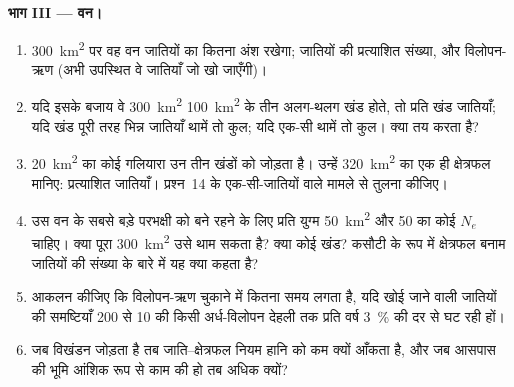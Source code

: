 \begin{problem}
\medskip
\noindent\textbf{भाग III --- वन।}
\begin{enumerate}[resume]
  \item \qty{300}{km^2} पर वह वन जातियों का कितना अंश रखेगा; जातियों की
        प्रत्याशित संख्या, और विलोपन-ऋण (अभी उपस्थित वे जातियाँ जो खो
        जाएँगी)।
  \item यदि इसके बजाय वे \qty{300}{km^2} \qty{100}{km^2} के तीन
        अलग-थलग खंड होते, तो प्रति खंड जातियाँ; यदि खंड पूरी तरह भिन्न
        जातियाँ थामें तो कुल; यदि एक-सी थामें तो कुल। क्या तय करता है?
  \item \qty{20}{km^2} का कोई गलियारा उन तीन खंडों को जोड़ता है। उन्हें
        \qty{320}{km^2} का एक ही क्षेत्रफल मानिए: प्रत्याशित जातियाँ।
        प्रश्न~14 के एक-सी-जातियों वाले मामले से तुलना कीजिए।
  \item उस वन के सबसे बड़े परभक्षी को बने रहने के लिए प्रति युग्म
        \qty{50}{km^2} और 50 का कोई $N_{e}$ चाहिए। क्या पूरा
        \qty{300}{km^2} उसे थाम सकता है? क्या कोई खंड? कसौटी के रूप में
        क्षेत्रफल बनाम जातियों की संख्या के बारे में यह क्या कहता है?
  \item आकलन कीजिए कि विलोपन-ऋण चुकाने में कितना समय लगता है, यदि खोई
        जाने वाली जातियों की समष्टियाँ 200 से 10 की किसी अर्ध-विलोपन
        देहली तक प्रति वर्ष \qty{3}{\%} की दर से घट रही हों।
  \item जब विखंडन  जोड़ता है तब जाति--क्षेत्रफल नियम हानि
        को कम क्यों आँकता है, और जब आसपास की भूमि आंशिक रूप से काम की हो
        तब अधिक क्यों?
\end{enumerate}


\end{problem}
